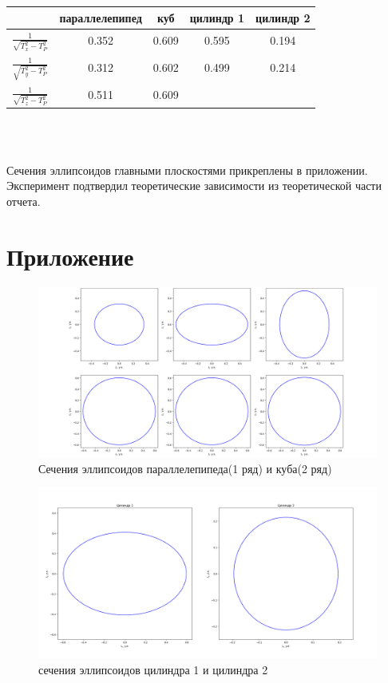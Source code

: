 \documentclass[a4paper, 12pt]{article}
\begin{document}
\begin{enumerate}
\begin{table}[h!]
        \begin{tabular}{|c|cccc|}
        \hline
        & параллелепипед& куб& цилиндр 1& цилиндр 2\\ \hline
        $\frac{1}{\sqrt{T_x^2-T_P^2}}$& 0.352& 0.609& 0.595& 0.194\\
        $\frac{1}{\sqrt{T_y^2-T_P^2}}$& 0.312& 0.602& 0.499& 0.214\\
        $\frac{1}{\sqrt{T_z^2-T_P^2}}$& 0.511& 0.609& &  \\ \hline
        \end{tabular}\\
    \end{table}\\
    Сечения эллипсоидов главными плоскостями прикреплены в приложении. Эксперимент подтвердил теоретические зависимости из теоретической части отчета.
\end{enumerate}\newpage
\section*{Приложение}
\begin{flushleft}
\begin{figure}[h!]
\includegraphics[width=500pt]{image/1.png}
\caption{Сечения эллипсоидов параллелепипеда(1 ряд) и куба(2 ряд)}
\end{figure}
\end{flushleft}
\begin{flushleft}
\begin{figure}[h!]
\includegraphics[width=500pt]{image/2.png}
\caption{сечения эллипсоидов цилиндра 1 и цилиндра 2}
\end{figure}
\end{flushleft}
\end{document}
